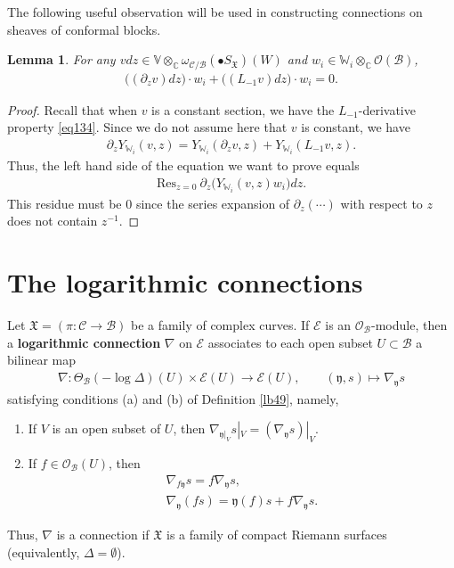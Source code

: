 \documentclass[12pt,a4paper,notitlepage]{report}
\theoremstyle{definition}
\theoremstyle{plain}
\newtheorem{lm}[df]{Lemma}
\newcommand{\fk}{\mathfrak}
\newcommand{\mc}{\mathcal}
\newcommand{\Res}{\mathrm{Res}}
\newcommand{\scr}{\mathscr}
\newcommand{\yk}{\mathfrak y}
\newcommand{\blt}{\bullet}
\newcommand{\Vbb}{\mathbb V}
\newcommand{\Wbb}{\mathbb W}
\newcommand{\Cbb}{\mathbb C}
\numberwithin{equation}{section}
\begin{document}
The following useful observation will be used in constructing connections on sheaves of conformal blocks.

\begin{lm}\label{lb55}
For any $vdz\in\Vbb\otimes_\Cbb\omega_{\mc C/\mc B}(\blt S_{\fk X})(W)$ and $w_i\in\Wbb_i\otimes_\Cbb\scr O(\mc B)$,
\begin{align*}
\big((\partial_zv)dz\big)\cdot w_i+\big((L_{-1}v)dz\big)\cdot w_i=0.
\end{align*}
\end{lm}

\begin{proof}
Recall that when $v$ is a constant section, we have the $L_{-1}$-derivative property \eqref{eq134}. Since we do not assume here that $v$ is constant, we have
\begin{align*}
\partial_z Y_{\Wbb_i}(v,z)=Y_{\Wbb_i}(\partial_zv,z)+Y_{\Wbb_i}(L_{-1}v,z).
\end{align*}
Thus, the left hand side of the equation we want to prove equals
\begin{align*}
\Res_{z=0}~\partial_z\big(Y_{\Wbb_i}(v,z)w_i\big)dz.
\end{align*}
This residue must be $0$ since the series expansion of $\partial_z(\cdots)$ with respect to $z$ does not contain $z^{-1}$.
\end{proof}






\section{The logarithmic connections}\label{lb84}


Let $\fk X=(\pi:\mc C\rightarrow\mc B)$ be a family of complex curves. If $\scr E$ is an $\scr O_{\mc B}$-module, then a \textbf{logarithmic connection} $\nabla$ on $\scr E$ associates to each open subset $U\subset \mc B$ a bilinear map
\begin{gather*}
\nabla:\Theta_{\mc B}(-\log\Delta)(U)\times\scr E(U)\rightarrow\scr E(U),\qquad (\yk,s)\mapsto \nabla_{\yk} s
\end{gather*}
satisfying conditions (a) and (b) of Definition \ref{lb49}, namely,
\begin{enumerate}[label=(\alph*)]
\item If $V$ is an open subset of $U$, then $\nabla_{\yk|_V}s|_V=(\nabla_{\yk} s)|_V$.
\item If $f\in\scr O_{\mc B}(U)$, then
\begin{gather*}
\nabla_{f\yk}s=f\nabla_{\yk}s,\\
\nabla_{\yk}(fs)=\yk(f)s+f\nabla_{\yk}s.
\end{gather*}
\end{enumerate}
Thus, $\nabla$ is a connection if $\fk X$ is a family of compact Riemann surfaces (equivalently, $\Delta=\emptyset$).
\end{document}
